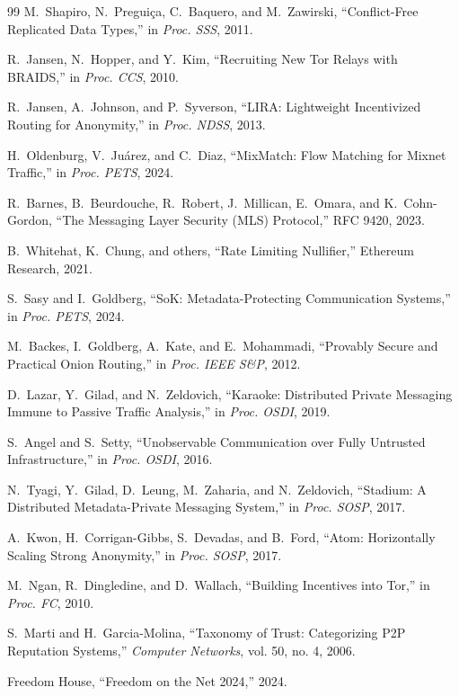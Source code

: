 \documentclass[11pt,a4paper]{article}
\begin{document}
\begin{thebibliography}{99}
M.~Shapiro, N.~Pregui{\c{c}}a, C.~Baquero, and M.~Zawirski, ``Conflict-Free Replicated Data Types,'' in \textit{Proc. SSS}, 2011.

R.~Jansen, N.~Hopper, and Y.~Kim, ``Recruiting New Tor Relays with BRAIDS,'' in \textit{Proc. CCS}, 2010.

R.~Jansen, A.~Johnson, and P.~Syverson, ``LIRA: Lightweight Incentivized Routing for Anonymity,'' in \textit{Proc. NDSS}, 2013.

H.~Oldenburg, V.~Ju{\'a}rez, and C.~Diaz, ``MixMatch: Flow Matching for Mixnet Traffic,'' in \textit{Proc. PETS}, 2024.

R.~Barnes, B.~Beurdouche, R.~Robert, J.~Millican, E.~Omara, and K.~Cohn-Gordon, ``The Messaging Layer Security (MLS) Protocol,'' RFC 9420, 2023.

B.~Whitehat, K.~Chung, and others, ``Rate Limiting Nullifier,'' Ethereum Research, 2021.

S.~Sasy and I.~Goldberg, ``SoK: Metadata-Protecting Communication Systems,'' in \textit{Proc. PETS}, 2024.

M.~Backes, I.~Goldberg, A.~Kate, and E.~Mohammadi, ``Provably Secure and Practical Onion Routing,'' in \textit{Proc. IEEE S\&P}, 2012.

D.~Lazar, Y.~Gilad, and N.~Zeldovich, ``Karaoke: Distributed Private Messaging Immune to Passive Traffic Analysis,'' in \textit{Proc. OSDI}, 2019.

S.~Angel and S.~Setty, ``Unobservable Communication over Fully Untrusted Infrastructure,'' in \textit{Proc. OSDI}, 2016.

N.~Tyagi, Y.~Gilad, D.~Leung, M.~Zaharia, and N.~Zeldovich, ``Stadium: A Distributed Metadata-Private Messaging System,'' in \textit{Proc. SOSP}, 2017.

A.~Kwon, H.~Corrigan-Gibbs, S.~Devadas, and B.~Ford, ``Atom: Horizontally Scaling Strong Anonymity,'' in \textit{Proc. SOSP}, 2017.

M.~Ngan, R.~Dingledine, and D.~Wallach, ``Building Incentives into Tor,'' in \textit{Proc. FC}, 2010.

S.~Marti and H.~Garcia-Molina, ``Taxonomy of Trust: Categorizing P2P Reputation Systems,'' \textit{Computer Networks}, vol. 50, no. 4, 2006.

Freedom House, ``Freedom on the Net 2024,'' 2024.


\end{thebibliography}
\end{document}
